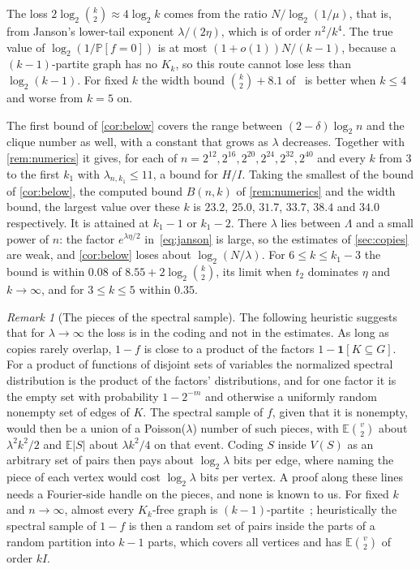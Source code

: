 \documentclass[11pt]{amsart}
\theoremstyle{remark}
\newtheorem{remark}[theorem]{Remark}
\newcommand{\E}{\mathbb{E}}
\renewcommand{\Pr}{\mathbb{P}}
\begin{document}
The loss $2\log_2\binom k2\approx4\log_2k$ comes from the ratio $N/\log_2(1/\mu)$, that is, from Janson's lower-tail
exponent $\lambda/(2\eta)$, which is of order $n^2/k^4$. The true value of $\log_2(1/\Pr[f=0])$ is at most
$(1+o(1))N/(k-1)$, because a $(k-1)$-partite graph has no $K_k$, so this route cannot lose less than
$\log_2(k-1)$. For fixed $k$ the width bound $\binom k2+8.1$ of~\cite{Shm26b} is better when $k\le4$ and worse from
$k=5$ on.

The first bound of \cref{cor:below} covers the range between $(2-\delta)\log_2n$ and the clique number as well, with
a constant that grows as $\lambda$ decreases. Together with \cref{rem:numerics} it gives, for each of
$n=2^{12},2^{16},2^{20},2^{24},2^{32},2^{40}$ and every $k$ from $3$ to the first $k_1$ with $\lambda_{n,k_1}\le11$, a
bound for $H/I$. Taking the smallest of the bound of \cref{cor:below}, the computed bound $B(n,k)$ of \cref{rem:numerics}
and the width bound, the largest value over these $k$ is $23.2$, $25.0$, $31.7$, $33.7$, $38.4$ and $34.0$ respectively. It is
attained at $k_1-1$ or $k_1-2$. There $\lambda$ lies between $\Lambda$ and a small power of $n$: the factor
$e^{\lambda\eta/2}$ in~\eqref{eq:janson} is large, so the estimates of \cref{sec:copies} are weak, and
\cref{cor:below} loses about
$\log_2(N/\lambda)$. For $6\le k\le k_1-3$ the bound is within $0.08$ of $8.55+2\log_2\binom k2$, its limit when
$t_2$ dominates $\eta$ and $k\to\infty$, and for $3\le k\le5$ within $0.35$.

\begin{remark}[The pieces of the spectral sample]\label{rem:super}
The following heuristic suggests that for $\lambda\to\infty$ the loss is in the coding and not in the estimates. As
long as copies rarely overlap, $1-f$ is close to a product of the factors $1-\mathbf 1[K\subseteq G]$. For a product
of functions of disjoint sets of variables the normalized spectral distribution is the product of the factors'
distributions, and for one factor it is the empty set with probability $1-2^{-m}$ and otherwise a uniformly random
nonempty set of edges of $K$. The spectral sample of $f$, given that it is nonempty, would then be a union of a
Poisson($\lambda$) number of such pieces, with $\E\binom v2$ about $\lambda^2k^2/2$ and $\E|S|$ about $\lambda k^2/4$
on that event. Coding $S$ inside $V(S)$ as an arbitrary set of pairs then pays about $\log_2\lambda$ bits per edge,
where naming the piece of each vertex would cost $\log_2\lambda$ bits per vertex. A proof along these lines needs a
Fourier-side handle on the pieces, and none is known to us. For fixed $k$ and $n\to\infty$, almost every $K_k$-free
graph is $(k-1)$-partite~\cite{KPR87}; heuristically the spectral sample of $1-f$ is then a random set of pairs inside
the parts of a random partition into $k-1$ parts, which covers all vertices and has $\E\binom v2$ of order $kI$.
\end{remark}
\end{document}
